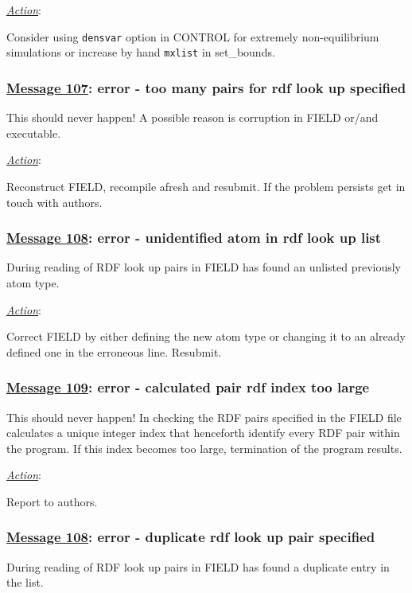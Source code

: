 \noindent \underline{\em Action}:

Consider using {\tt densvar} option in CONTROL for extremely
non-equilibrium simulations or increase by hand {\tt mxlist} in
{\sc set\_bounds}.

\subsubsection*{\underline{Message 107}: error - too many pairs for rdf look up specified}

This should never happen!  A possible reason is corruption in
FIELD or/and \D executable.

\noindent \underline{\em Action}:

Reconstruct FIELD, recompile afresh \D and resubmit.  If the
problem persists get in touch with \D authors.

\subsubsection*{\underline{Message 108}: error - unidentified atom in rdf look up list}

During reading of RDF look up pairs in FIELD \D has found an
unlisted previously atom type.

\noindent \underline{\em Action}:

Correct FIELD by either defining the new atom type or changing it
to an already defined one in the erroneous line.  Resubmit.

\subsubsection*{\underline{Message 109}: error - calculated pair rdf index too large}

This should never happen!  In checking the RDF pairs specified in
the FIELD file \D calculates a unique integer index that
henceforth identify every RDF pair within the program.  If this
index becomes too large, termination of the program results.

\noindent \underline{\em Action}:

Report to authors.

\subsubsection*{\underline{Message 108}: error - duplicate rdf look up pair specified}

During reading of RDF look up pairs in FIELD \D has found a
duplicate entry in the list.

